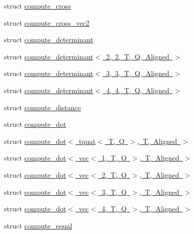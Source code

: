 \begin{DoxyCompactItemize}
\item 
struct \mbox{\hyperlink{structglm_1_1detail_1_1compute__cross}{compute\+\_\+cross}}
\item 
struct \mbox{\hyperlink{structglm_1_1detail_1_1compute__cross__vec2}{compute\+\_\+cross\+\_\+vec2}}
\item 
struct \mbox{\hyperlink{structglm_1_1detail_1_1compute__determinant}{compute\+\_\+determinant}}
\item 
struct \mbox{\hyperlink{structglm_1_1detail_1_1compute__determinant_3_012_00_012_00_01_t_00_01_q_00_01_aligned_01_4}{compute\+\_\+determinant$<$ 2, 2, T, Q, Aligned $>$}}
\item 
struct \mbox{\hyperlink{structglm_1_1detail_1_1compute__determinant_3_013_00_013_00_01_t_00_01_q_00_01_aligned_01_4}{compute\+\_\+determinant$<$ 3, 3, T, Q, Aligned $>$}}
\item 
struct \mbox{\hyperlink{structglm_1_1detail_1_1compute__determinant_3_014_00_014_00_01_t_00_01_q_00_01_aligned_01_4}{compute\+\_\+determinant$<$ 4, 4, T, Q, Aligned $>$}}
\item 
struct \mbox{\hyperlink{structglm_1_1detail_1_1compute__distance}{compute\+\_\+distance}}
\item 
struct \mbox{\hyperlink{structglm_1_1detail_1_1compute__dot}{compute\+\_\+dot}}
\item 
struct \mbox{\hyperlink{structglm_1_1detail_1_1compute__dot_3_01tquat_3_01_t_00_01_q_01_4_00_01_t_00_01_aligned_01_4}{compute\+\_\+dot$<$ tquat$<$ T, Q $>$, T, Aligned $>$}}
\item 
struct \mbox{\hyperlink{structglm_1_1detail_1_1compute__dot_3_01vec_3_011_00_01_t_00_01_q_01_4_00_01_t_00_01_aligned_01_4}{compute\+\_\+dot$<$ vec$<$ 1, T, Q $>$, T, Aligned $>$}}
\item 
struct \mbox{\hyperlink{structglm_1_1detail_1_1compute__dot_3_01vec_3_012_00_01_t_00_01_q_01_4_00_01_t_00_01_aligned_01_4}{compute\+\_\+dot$<$ vec$<$ 2, T, Q $>$, T, Aligned $>$}}
\item 
struct \mbox{\hyperlink{structglm_1_1detail_1_1compute__dot_3_01vec_3_013_00_01_t_00_01_q_01_4_00_01_t_00_01_aligned_01_4}{compute\+\_\+dot$<$ vec$<$ 3, T, Q $>$, T, Aligned $>$}}
\item 
struct \mbox{\hyperlink{structglm_1_1detail_1_1compute__dot_3_01vec_3_014_00_01_t_00_01_q_01_4_00_01_t_00_01_aligned_01_4}{compute\+\_\+dot$<$ vec$<$ 4, T, Q $>$, T, Aligned $>$}}
\item 
struct \mbox{\hyperlink{structglm_1_1detail_1_1compute__equal}{compute\+\_\+equal}}
\item 

\end{DoxyCompactItemize}
